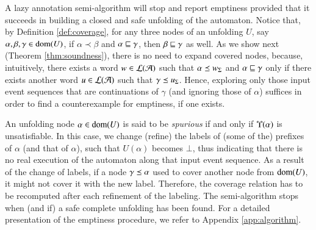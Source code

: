 A lazy annotation semi-algorithm will stop and report emptiness
provided that it succeeds in building a closed and safe unfolding of
the automaton. Notice that, by Definition \ref{def:coverage}, for any
three nodes of an unfolding $U$, say $\alpha,\beta,\gamma \in
\mathrm{dom}(U)$, if $\alpha \prec \beta$ and $\alpha \sqsubseteq \gamma$, then
$\beta \sqsubseteq \gamma$ as well. As we show next (Theorem
\ref{thm:soundness}), there is no need to expand covered nodes,
because, intuitively, there exists a word $w \in {\mathcal L}({\mathcal{A}})$ such that
$\alpha \preceq {w}_\Sigma$ and $\alpha \sqsubseteq \gamma$ only if there
exists another word $u \in {\mathcal L}({\mathcal{A}})$ such that $\gamma \preceq
{u}_\Sigma$. Hence, exploring only those input event sequences that are
continuations of $\gamma$ (and ignoring those of $\alpha$) suffices in
order to find a counterexample for emptiness, if one exists.

An unfolding node $\alpha \in \mathrm{dom}(U)$ is said to be \emph{spurious}
if and only if $\Upsilon({\alpha})$ is unsatisfiable. In this case, we
change (refine) the labels of (some of the) prefixes of $\alpha$ (and
that of $\alpha$), such that $U(\alpha)$ becomes $\bot$, thus
indicating that there is no real execution of the automaton along that
input event sequence. As a result of the change of labels, if a node
$\gamma \preceq \alpha$ used to cover another node from $\mathrm{dom}(U)$, it
might not cover it with the new label. Therefore, the coverage
relation has to be recomputed after each refinement of the
labeling. The semi-algorithm stops when (and if) a safe complete
unfolding has been found. For a detailed presentation of the emptiness
procedure, we refer to Appendix \ref{app:algorithm}.

